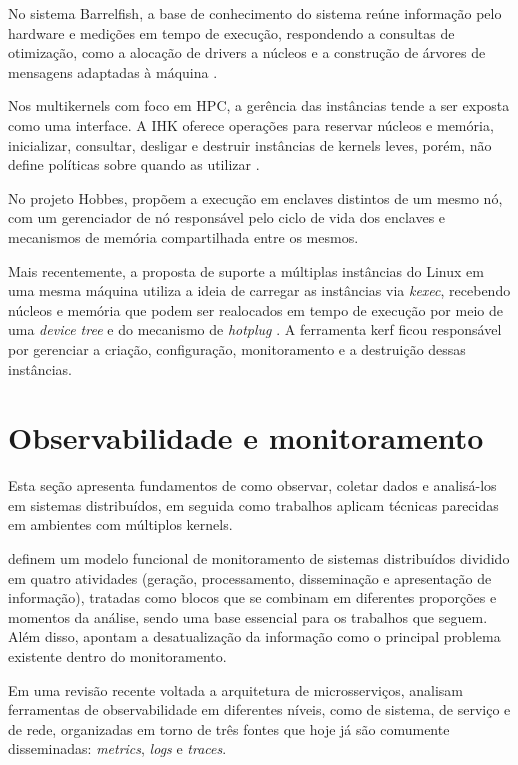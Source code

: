 No sistema Barrelfish, a base de conhecimento do sistema reúne informação pelo hardware e medições em tempo de execução, respondendo
a consultas de otimização, como a alocação de drivers a núcleos e a construção de árvores de mensagens adaptadas à máquina
\citep{baumann2009multikernel,schupbach2008diversity}.

Nos multikernels com foco em HPC, a gerência das instâncias tende a ser exposta como uma interface.
A IHK oferece operações para reservar núcleos e memória, inicializar, consultar, desligar e destruir instâncias
de kernels leves, porém, não define políticas sobre quando as utilizar \citep{shimosawa2014ihk}.

No projeto Hobbes, \citet{kocoloski2015composition} propõem a execução em enclaves distintos de um mesmo nó, com um
gerenciador de nó responsável pelo ciclo de vida dos enclaves e mecanismos de memória compartilhada entre os mesmos.

Mais recentemente, a proposta de suporte a múltiplas instâncias do Linux em uma mesma máquina \citep{wang2025multikernel}
utiliza a ideia de carregar as instâncias via \textit{kexec}, recebendo núcleos e memória que podem ser
realocados em tempo de execução por meio de uma \textit{device tree} e do mecanismo de \textit{hotplug}
\citep{wang2025lpc}.
A ferramenta kerf \citep{multikernel2025kerf} ficou responsável por gerenciar a criação, configuração, monitoramento e a
destruição dessas instâncias.

\section{Observabilidade e monitoramento}
\label{sec:rel-observabilidade}

Esta seção apresenta fundamentos de como observar, coletar dados e analisá-los em sistemas distribuídos, em seguida como
trabalhos aplicam técnicas parecidas em ambientes com múltiplos kernels.

\citet{mansourisamani1993monitoring} definem um modelo funcional de monitoramento de sistemas distribuídos dividido em
quatro atividades (geração, processamento, disseminação e apresentação de informação), tratadas como blocos que se combinam
em diferentes proporções e momentos da análise, sendo uma base essencial para os trabalhos que seguem.
Além disso, apontam a desatualização da informação como o principal problema existente dentro do monitoramento.

Em uma revisão recente voltada a arquitetura de microsserviços, \citet{faseeha2025observability} analisam ferramentas de
observabilidade em diferentes níveis, como de sistema, de serviço e de rede, organizadas em torno de três fontes que hoje já são comumente disseminadas:
\textit{metrics}, \textit{logs} e \textit{traces}.

